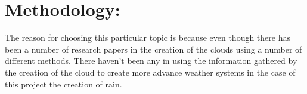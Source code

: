 \clearpage
\section{Methodology:}
\label{sec:meth}

The reason for choosing this particular topic is because even though there has been a number of research papers in the creation of the clouds using a number of different methods.
There haven't been any in using the information gathered by the creation of the cloud to create more advance weather systems in the case of this project the creation of rain.


